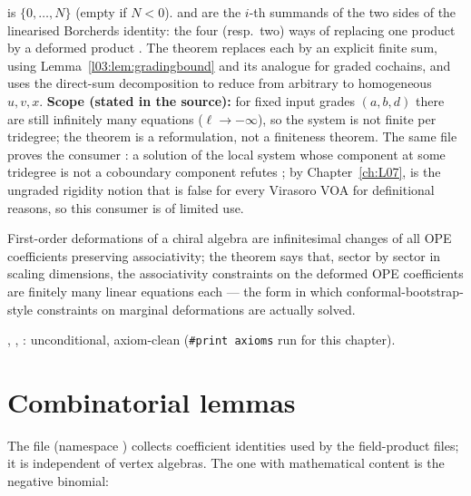 \begin{dictionary}
 is $\{0,\dots,N\}$ (empty if $N<0$).  and  are the $i$-th
summands of the two sides of the linearised Borcherds identity: the four (resp.\ two) ways of replacing
one product by a deformed product . The theorem replaces each  by an explicit
finite sum, using Lemma~\ref{l03:lem:gradingbound} and its analogue for graded cochains, and uses the
direct-sum decomposition to reduce from arbitrary to homogeneous $u,v,x$. \textbf{Scope (stated in the
source):} for fixed input grades $(a,b,d)$ there are still infinitely many equations ($\ell\to-\infty$),
so the system is not finite per tridegree; the theorem is a reformulation, not a finiteness theorem.
The same file proves the consumer : a solution of the local system whose
component at some tridegree is not a coboundary component refutes ; by
Chapter~\ref{ch:L07},  is the ungraded rigidity notion that is false for every Virasoro VOA
for definitional reasons, so this consumer is of limited use.
\end{dictionary}

\begin{physics}
First-order deformations of a chiral algebra are infinitesimal changes of all OPE coefficients
preserving associativity; the theorem says that, sector by sector in scaling dimensions, the
associativity constraints on the deformed OPE coefficients are finitely many linear equations each ---
the form in which conformal-bootstrap-style constraints on marginal deformations are actually
solved.
\end{physics}

\begin{status}
, , :
unconditional, axiom-clean (\texttt{\#print axioms} run for this chapter).
\end{status}

\section{Combinatorial lemmas}\label{l03:sec:combinatorics}

The file  (namespace
) collects coefficient identities used by the field-product files; it
is independent of vertex algebras. The one with mathematical content is the negative binomial:

